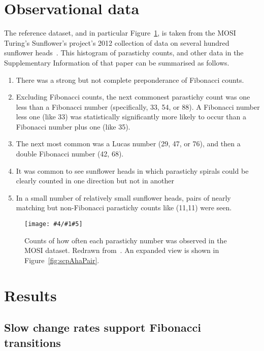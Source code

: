 \documentclass[a4paper,10pt]{amsart}
\newlength{\jfigwidth}
\newcommand{\pdffig}[3]{\jdofig{#1}{#2}{#3}{Figures}{.pdf}}
\newcommand{\jdofig}[5]{
	\begin{figure}\centering\texttt{[image: \#4/\#1\#5]} \caption{#2}\label{fig:#1}\end{figure}
}
\begin{document}
\section{Observational data}
The reference dataset, and in particular Figure~\ref{fig:scpMOSIHistogram},  is taken from the MOSI Turing's Sunflower's project's 2012 collection of data on several hundred sunflower heads~\cite{swintonNovelFibonacciNonFibonacci2016}.    This histogram of parastichy counts, and other data in the Supplementary Information of that paper can be summarised as follows.
\begin{enumerate}
	\item There was a strong but not complete preponderance of Fibonacci counts.
	\item	Excluding Fibonacci counts, the next commonest parastichy count was one less than a Fibonacci number (specifically, 33, 54, or 88).  A Fibonacci number less one (like 33) was statistically significantly more likely to occur than a Fibonacci number plus one (like 35).
	\item The next most common was a Lucas number (29, 47, or 76), and then a double Fibonacci number (42, 68).
	\item It was common to see sunflower heads in which parastichy spirals could be clearly counted in one direction but not in another
	\item In a small number of relatively small sunflower heads, pairs of nearly matching but non-Fibonacci parastichy counts like (11,11)  were seen.
\end{enumerate}

\pdffig{scpMOSIHistogram}{Counts of how often each parastichy number  was observed in the MOSI dataset. Redrawn from~\cite{swintonNovelFibonacciNonFibonacci2016}. An expanded view is shown in Figure~\ref{fig:scpAhaPair}.}{1}


\section{Results}

 


\subsection{Slow change rates support Fibonacci transitions}
	
\end{document}
